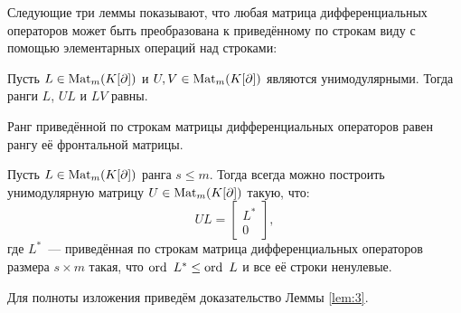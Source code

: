         Следующие три леммы показывают, что любая 
        матрица дифференциальных операторов может быть преобразована к 
        приведённому по строкам виду с помощью элементарных операций над строками:
        \begin{lemma}
            \label{lem:1}
            Пусть $L \in \mathop{\mathrm{Mat}}\nolimits_m(K[\partial])$ и $U,V \in \mathop{\mathrm{Mat}}\nolimits_m(K[\partial])$ 
            являются унимодулярными. Тогда ранги $L$, $UL$ и $LV$ равны.
        \end{lemma}
        \begin{lemma}
            \label{lem:2}
            Ранг приведённой по строкам матрицы дифференциальных операторов 
            равен рангу её фронтальной матрицы.
        \end{lemma}
        \begin{lemma}
            \label{lem:3}
            Пусть $L\in \mathop{\mathrm{Mat}}\nolimits_m(K[\partial])$ ранга $s \leq m$. Тогда всегда 
            можно построить унимодулярную матрицу $U\in \mathop{\mathrm{Mat}}\nolimits_m(K[\partial])$ 
            такую, что:
            $$UL=\left[
                \begin{array}{cc}
                    L^{*} \\ \hline
                    0
                \end{array}
            \right],$$
            где $L^{*}$~--- приведённая по строкам матрица дифференциальных операторов
            размера $s\times m$ такая, что $\mathop{\mathrm{ord}}\nolimits~L^{*} \leq \mathop{\mathrm{ord}}\nolimits~L$ и все её строки
            ненулевые.
        \end{lemma}
        Для полноты изложения приведём доказательство Леммы \ref{lem:3}.
